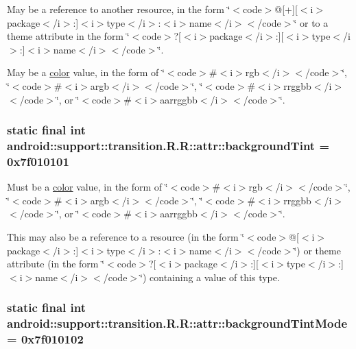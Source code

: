 May be a reference to another resource, in the form \char`\"{}$<$code$>$@\mbox{[}+\mbox{]}\mbox{[}$<$i$>$package$<$/i$>$:\mbox{]}$<$i$>$type$<$/i$>$:$<$i$>$name$<$/i$>$$<$/code$>$\char`\"{} or to a theme attribute in the form \char`\"{}$<$code$>$?\mbox{[}$<$i$>$package$<$/i$>$:\mbox{]}\mbox{[}$<$i$>$type$<$/i$>$:\mbox{]}$<$i$>$name$<$/i$>$$<$/code$>$\char`\"{}. 

May be a \hyperlink{classandroid_1_1support_1_1transition_1_1_r_1_1color}{color} value, in the form of \char`\"{}$<$code$>$\#$<$i$>$rgb$<$/i$>$$<$/code$>$\char`\"{}, \char`\"{}$<$code$>$\#$<$i$>$argb$<$/i$>$$<$/code$>$\char`\"{}, \char`\"{}$<$code$>$\#$<$i$>$rrggbb$<$/i$>$$<$/code$>$\char`\"{}, or \char`\"{}$<$code$>$\#$<$i$>$aarrggbb$<$/i$>$$<$/code$>$\char`\"{}. \hypertarget{classandroid_1_1support_1_1transition_1_1_r_1_1attr_bb7af7305bdd56423e5421486b4cf4af}{
\subsubsection[{backgroundTint}]{\setlength{\rightskip}{0pt plus 5cm}static final int android::support::transition.R.R::attr::backgroundTint = 0x7f010101}}
\label{classandroid_1_1support_1_1transition_1_1_r_1_1attr_bb7af7305bdd56423e5421486b4cf4af}


Must be a \hyperlink{classandroid_1_1support_1_1transition_1_1_r_1_1color}{color} value, in the form of \char`\"{}$<$code$>$\#$<$i$>$rgb$<$/i$>$$<$/code$>$\char`\"{}, \char`\"{}$<$code$>$\#$<$i$>$argb$<$/i$>$$<$/code$>$\char`\"{}, \char`\"{}$<$code$>$\#$<$i$>$rrggbb$<$/i$>$$<$/code$>$\char`\"{}, or \char`\"{}$<$code$>$\#$<$i$>$aarrggbb$<$/i$>$$<$/code$>$\char`\"{}. 

This may also be a reference to a resource (in the form \char`\"{}$<$code$>$@\mbox{[}$<$i$>$package$<$/i$>$:\mbox{]}$<$i$>$type$<$/i$>$:$<$i$>$name$<$/i$>$$<$/code$>$\char`\"{}) or theme attribute (in the form \char`\"{}$<$code$>$?\mbox{[}$<$i$>$package$<$/i$>$:\mbox{]}\mbox{[}$<$i$>$type$<$/i$>$:\mbox{]}$<$i$>$name$<$/i$>$$<$/code$>$\char`\"{}) containing a value of this type. \hypertarget{classandroid_1_1support_1_1transition_1_1_r_1_1attr_5ebcb7ed92cd974fd659c4320703cb7a}{
\subsubsection[{backgroundTintMode}]{\setlength{\rightskip}{0pt plus 5cm}static final int android::support::transition.R.R::attr::backgroundTintMode = 0x7f010102}}
\label{classandroid_1_1support_1_1transition_1_1_r_1_1attr_5ebcb7ed92cd974fd659c4320703cb7a}


